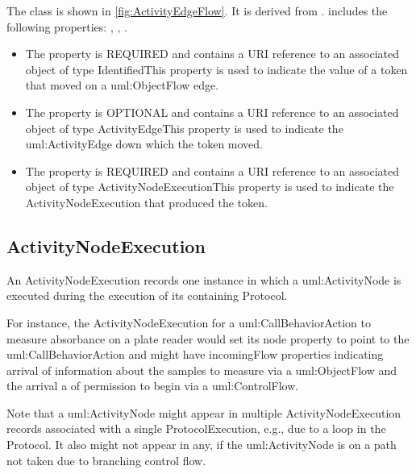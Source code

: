 %
The  class is shown in \ref{fig:ActivityEdgeFlow}. It is derived from .%
 includes the following properties: , , . %
\begin{itemize}%
\item%
The  property is REQUIRED and contains a URI reference to an associated object of type IdentifiedThis property is used to indicate the value of a token that moved on a uml:ObjectFlow edge.%
\item%
The  property is OPTIONAL and contains a URI reference to an associated object of type ActivityEdgeThis property is used to indicate the uml:ActivityEdge down which the token moved.%
\item%
The  property is REQUIRED and contains a URI reference to an associated object of type ActivityNodeExecutionThis property is used to indicate the ActivityNodeExecution that produced the token.%
\end{itemize}%
\subsection{ActivityNodeExecution}%
\label{sec:paml:ActivityNodeExecution}%
An ActivityNodeExecution records one instance in which a uml:ActivityNode is executed during the
        execution of its containing Protocol.

        For instance, the ActivityNodeExecution for a uml:CallBehaviorAction to measure absorbance on a plate reader
        would set its node property to point to the uml:CallBehaviorAction and might have incomingFlow properties
        indicating arrival of information about the samples to measure via a uml:ObjectFlow and the arrival a
        of permission to begin via a uml:ControlFlow.

        Note that a uml:ActivityNode might appear in multiple ActivityNodeExecution records associated with a single
        ProtocolExecution, e.g., due to a loop in the Protocol.  It also might not appear in any, if the
        uml:ActivityNode is on a path not taken due to branching control flow.%
\linebreak%
\linebreak%


